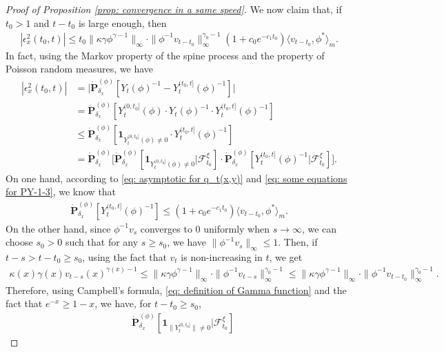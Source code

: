 \begin{proof}[Proof of Proposition \ref{prop: convergence in a same speed}]
	We now claim that, if $t_0 > 1$ and $t-t_0$ is large enough, then
\begin{align}\label{eq:upperbound_of_epsilon-2}
	|\epsilon_x^2(t_0,t)|
	\leq t_0\|\kappa\gamma\phi^{\gamma - 1}\|_{\infty} \cdot \|\phi^{-1}v_{t-t_0}\|^{\gamma_0-1}_\infty (1+c_0 e^{-c_1 t_0}) \langle v_{t-t_0},\phi^* \rangle_m.
\end{align}
	In fact, using the Markov property of the spine process and the property of Poisson random measures, we have
\begin{align}\label{eq:epsilon-2}
	|\epsilon_x^2(t_0,t)|
	&= \big| \dot{\mathbf P}_{\delta_x}^{(\phi)}[Y_t(\phi)^{-1} - Y^{(t_0,t]}_t(\phi)^{-1}] \big|
	\\&= \dot{\mathbf P}_{\delta_x}^{(\phi)}[Y_t^{(0,t_0]}(\phi)\cdot Y_t(\phi)^{-1}\cdot Y^{(t_0,t]}_t(\phi)^{-1}]
	\\&\leq \dot{\mathbf P}_{\delta_x}^{(\phi)}[\mathbf 1_{Y_t^{(0,t_0]}(\phi)\neq 0}\cdot Y^{(t_0,t]}_t(\phi)^{-1}]
	\\&= \dot{\mathbf P}_{\delta_x}^{(\phi)} \big[\dot{\mathbf P}_{\delta_x}^{(\phi)}[\mathbf 1_{Y_t^{(0,t_0]}(\phi)\neq 0}|\mathscr F^\xi_{t_0}] \cdot \dot{\mathbf P}_{\delta_x}^{(\phi)} [ Y^{(t_0,t]}_t(\phi)^{-1}|\mathscr F^\xi_{t_0}] \big].
\end{align}
	On one hand, according to \eqref{eq: asymptotic for q_t(x,y)} and \eqref{eq: some equations for PY-1-3}, we know that
\begin{align}\label{eq:epsilon-2-final}
	\dot{\mathbf P}_{\delta_x}^{(\phi)}[ Y^{(t_0,t]}_t(\phi)^{-1}]
	\leq (1+c_0 e^{-c_1 t_0}) \langle v_{t-t_0},\phi^* \rangle_m.
\end{align}
	On the other hand, since $\phi^{-1}v_s$ converges to $0$ uniformly when $s\to \infty$, we can choose  $s_0>0$ such that for any $s\geq s_0$, we have $\|\phi^{-1}v_s\|_{\infty} \leq 1$.
	Then, if $t-s > t-t_0 \geq s_0$,
	using the fact that $v_t$ is non-increasing in $t$, we get
\begin{align}
	\kappa(x)\gamma(x) v_{t-s}(x)^{\gamma(x)-1}
	\leq \|\kappa \gamma \phi^{\gamma - 1}\|_\infty \cdot \|\phi^{-1} v_{t-s}\|^{\gamma_0-1}_\infty
	\leq \|\kappa\gamma\phi^{\gamma - 1}\|_\infty \cdot \|\phi^{-1}v_{t-t_0}\|^{\gamma_0-1}_\infty.
\end{align}
	Therefore, using Campbell's formula, \eqref{eq: definition of Gamma function} and the fact that $e^{-x} \geq 1-x$, we have,  for $t-t_0 \geq s_0$,
\begin{align}
	&\dot{\mathbf P}_{\delta_x}^{(\phi)}[\mathbf 1_{\| Y_t^{(0,t_0]}\|\neq 0}|\mathscr F^\xi_{t_0}]

\end{align}
\end{proof}
